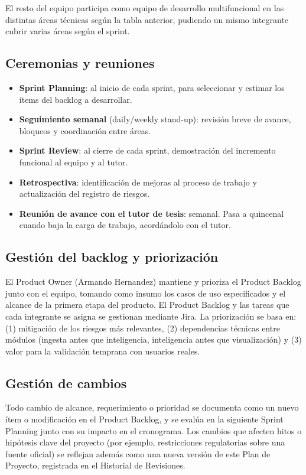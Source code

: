 \documentclass[11pt,a4paper]{article}
\begin{document}
El resto del equipo participa como equipo de desarrollo multifuncional en las distintas \'areas t\'ecnicas seg\'un la tabla anterior, pudiendo un mismo integrante cubrir varias \'areas seg\'un el sprint.

\subsection{Ceremonias y reuniones}

\begin{itemize}
  \item \textbf{Sprint Planning}: al inicio de cada sprint, para seleccionar y estimar los \'items del backlog a desarrollar.
  \item \textbf{Seguimiento semanal} (daily/weekly stand-up): revisi\'on breve de avance, bloqueos y coordinaci\'on entre \'areas.
  \item \textbf{Sprint Review}: al cierre de cada sprint, demostraci\'on del incremento funcional al equipo y al tutor.
  \item \textbf{Retrospectiva}: identificaci\'on de mejoras al proceso de trabajo y actualizaci\'on del registro de riesgos.
  \item \textbf{Reuni\'on de avance con el tutor de tesis}: semanal. Pasa a quincenal cuando baja la carga de trabajo, acord\'andolo con el tutor.
\end{itemize}

\subsection{Gesti\'on del backlog y priorizaci\'on}

El Product Owner (Armando Hernandez) mantiene y prioriza el Product Backlog junto con el equipo, tomando como insumo los casos de uso especificados y el alcance de la primera etapa del producto. El Product Backlog y las tareas que cada integrante se asigna se gestionan mediante Jira. La priorizaci\'on se basa en: (1) mitigaci\'on de los riesgos m\'as relevantes, (2) dependencias t\'ecnicas entre m\'odulos (ingesta antes que inteligencia, inteligencia antes que visualizaci\'on) y (3) valor para la validaci\'on temprana con usuarios reales.

\subsection{Gesti\'on de cambios}

Todo cambio de alcance, requerimiento o prioridad se documenta como un nuevo \'item o modificaci\'on en el Product Backlog, y se eval\'ua en la siguiente Sprint Planning junto con su impacto en el cronograma. Los cambios que afecten hitos o hip\'otesis clave del proyecto (por ejemplo, restricciones regulatorias sobre una fuente oficial) se reflejan adem\'as como una nueva versi\'on de este Plan de Proyecto, registrada en el Historial de Revisiones.
\end{document}

